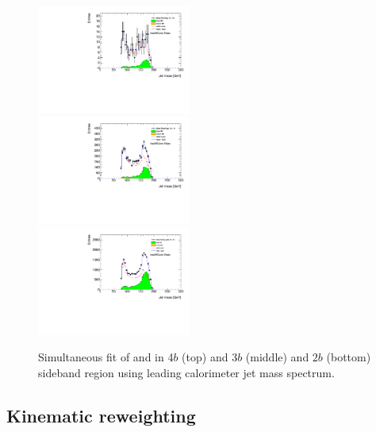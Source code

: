 \begin{figure}[htbp!]
\begin{center}
 \includegraphics[angle=270, width=0.45\textwidth]{./figures/boosted/Fit/fitNorm_i4.pdf}\\
 \includegraphics[angle=270, width=0.45\textwidth]{./figures/boosted/Fit/fitNorm_i3.pdf}\\
 \includegraphics[angle=270, width=0.45\textwidth]{./figures/boosted/Fit/fitNorm_i2s.pdf}\\
\caption{Simultaneous fit of \muqcd and \alphatt in 4$b$ (top) and 3$b$ (middle) and $2b$ (bottom) sideband region using leading \largeR calorimeter jet mass spectrum.}
\label{fig:ttbar-fit}
\end{center}
\end{figure}

\clearpage


\subsection{Kinematic reweighting}
\label{sec:boosted-reweight}


